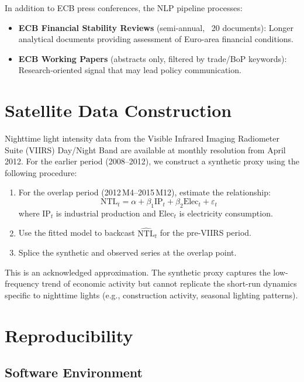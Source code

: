 In addition to ECB press conferences, the NLP pipeline processes:
\begin{itemize}
  \item \textbf{ECB Financial Stability Reviews} (semi-annual, ~20 documents): Longer analytical documents providing assessment of Euro-area financial conditions.
  \item \textbf{ECB Working Papers} (abstracts only, filtered by trade/BoP keywords): Research-oriented signal that may lead policy communication.
\end{itemize}


\section{Satellite Data Construction}
\label{app:satellite}

Nighttime light intensity data from the Visible Infrared Imaging Radiometer Suite (VIIRS) Day/Night Band are available at monthly resolution from April 2012.  For the earlier period (2008--2012), we construct a synthetic proxy using the following procedure:

\begin{enumerate}
  \item For the overlap period (2012\,M4--2015\,M12), estimate the relationship:
    \[
      \text{NTL}_t = \alpha + \beta_1 \text{IP}_t + \beta_2 \text{Elec}_t + \varepsilon_t
    \]
    where $\text{IP}_t$ is industrial production and $\text{Elec}_t$ is electricity consumption.
  \item Use the fitted model to backcast $\widehat{\text{NTL}}_t$ for the pre-VIIRS period.
  \item Splice the synthetic and observed series at the overlap point.
\end{enumerate}

This is an acknowledged approximation.  The synthetic proxy captures the low-frequency trend of economic activity but cannot replicate the short-run dynamics specific to nighttime lights (e.g., construction activity, seasonal lighting patterns).


\section{Reproducibility}
\label{app:reproducibility}

\subsection{Software Environment}

